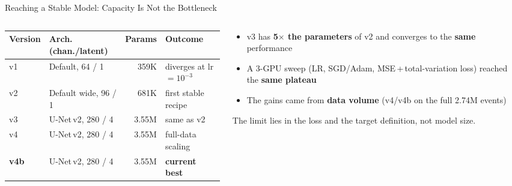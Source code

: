 \documentclass[xcolor=table,aspectratio=169]{beamer}
\begin{document}
\begin{frame}{Reaching a Stable Model: Capacity Is Not the Bottleneck}
    \begin{columns}[c]
        \begin{column}{0.62\linewidth}
            \centering
            \footnotesize
            \begin{tabular}{llrl}
                \toprule
                Version & Arch. (chan./latent) & Params & Outcome \\
                \midrule
                v1  & Default, 64 / 1     & 359K & diverges at lr$=10^{-3}$ \\
                v2  & Default wide, 96 / 1 & 681K & first stable recipe \\
                v3  & U-Net\,v2, 280 / 4  & 3.55M & same as v2 \\
                v4  & U-Net\,v2, 280 / 4  & 3.55M & full-data scaling \\
                \textbf{v4b} & U-Net\,v2, 280 / 4 & 3.55M & \textbf{current best} \\
                \bottomrule
            \end{tabular}
        \end{column}
        \begin{column}{0.38\linewidth}
            \small
            \begin{itemize}\setlength\itemsep{0.35em}
                \item v3 has \textbf{5$\times$ the parameters} of v2 and converges to the \textbf{same} performance
                \item A 3-GPU sweep (LR, SGD/Adam, MSE\,+\,total-variation loss) reached the \textbf{same plateau}
                \item The gains came from \textbf{data volume} (v4/v4b on the full 2.74M events)
            \end{itemize}
            \vspace{0.4em}
            {\footnotesize\textcolor{black!55}{The limit lies in the loss and the target definition, not model size.}}
        \end{column}
    \end{columns}
\end{frame}
\end{document}

